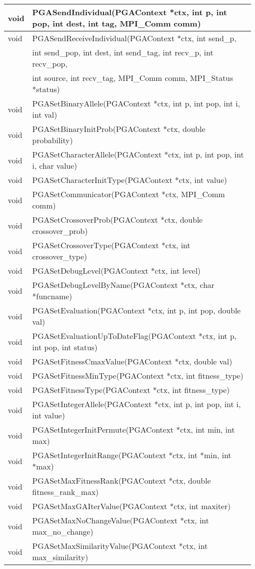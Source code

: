 \documentclass{report}
\begin{document}
\begin{tabular}{|l|l|}
void &  PGASendIndividual(PGAContext *ctx, int p, int pop, int dest, int tag,
MPI\_Comm comm) \\ \hline
void &  PGASendReceiveIndividual(PGAContext *ctx, int send\_p, \\
     &  int send\_pop, int dest, int send\_tag, int recv\_p, int recv\_pop, \\
     &  int source, int recv\_tag, MPI\_Comm comm, MPI\_Status *status) \\ \hline
void &  PGASetBinaryAllele(PGAContext *ctx, int p, int pop, int i, int val) \\
\hline
void &  PGASetBinaryInitProb(PGAContext *ctx, double probability) \\ \hline
void &  PGASetCharacterAllele(PGAContext *ctx, int p, int pop, int i, char
value) \\ \hline
void &  PGASetCharacterInitType(PGAContext *ctx, int value) \\ \hline
void &  PGASetCommunicator(PGAContext *ctx, MPI\_Comm comm) \\ \hline
void &  PGASetCrossoverProb(PGAContext *ctx, double crossover\_prob) \\ \hline
void &  PGASetCrossoverType(PGAContext *ctx, int crossover\_type) \\ \hline
void &  PGASetDebugLevel(PGAContext *ctx, int level) \\ \hline
void &  PGASetDebugLevelByName(PGAContext *ctx, char *funcname) \\ \hline
void &  PGASetEvaluation(PGAContext *ctx, int p, int pop, double val) \\ \hline
void &  PGASetEvaluationUpToDateFlag(PGAContext *ctx, int p, int pop, int
status) \\ \hline
void &  PGASetFitnessCmaxValue(PGAContext *ctx, double val) \\ \hline
void &  PGASetFitnessMinType(PGAContext *ctx, int fitness\_type) \\ \hline
void &  PGASetFitnessType(PGAContext *ctx, int fitness\_type) \\ \hline
void &  PGASetIntegerAllele(PGAContext *ctx, int p, int pop, int i, int value)
\\ \hline
void &  PGASetIntegerInitPermute(PGAContext *ctx, int min, int max) \\ \hline
void &  PGASetIntegerInitRange(PGAContext *ctx, int *min, int *max) \\ \hline
void &  PGASetMaxFitnessRank(PGAContext *ctx, double fitness\_rank\_max) \\ \hline
void &  PGASetMaxGAIterValue(PGAContext *ctx, int maxiter) \\ \hline
void &  PGASetMaxNoChangeValue(PGAContext *ctx, int max\_no\_change) \\ \hline
void &  PGASetMaxSimilarityValue(PGAContext *ctx, int max\_similarity) \\ \hline
\end{tabular}
\end{document}

